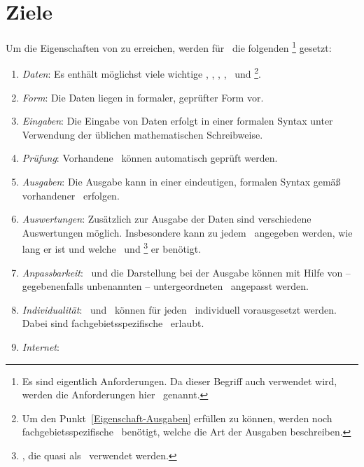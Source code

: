 \section{Ziele}%
\label{sec-Ziele}

Um die Eigenschaften von  zu erreichen, werden für \ASBA\ die folgenden \Ziele%
\footnote{%
	Es sind eigentlich Anforderungen.
	Da dieser Begriff auch  verwendet wird, werden die Anforderungen hier \Ziele\ genannt.
}
gesetzt:
\begin{enumerate}
	\item \label{Ziel-Daten} \emph{Daten}:
	Es enthält möglichst viele wichtige \Axiome, \Saetze, \Beweise, \Fachbegriffe, \Fachgebiete\ und \Ausgabeschemata%
	\footnote{%
		Um den Punkt~\ref{Eigenschaft-Ausgaben}  erfüllen zu können, werden noch fachgebietsspezifische \Ausgabeschemata\ benötigt, welche die Art der Ausgaben beschreiben.
	}.
	\item \label{Ziel-Form} \emph{Form}:
	Die Daten liegen in formaler, geprüfter Form vor.
	\item \label{Ziel-Eingaben} \emph{Eingaben}:
	Die Eingabe von Daten erfolgt in einer formalen Syntax unter Verwendung der üblichen mathematischen Schreibweise.
	\item \label{Ziel-Pruefung} \emph{Prüfung}:
	Vorhandene \Beweise\ können automatisch geprüft werden.
	\item \label{Ziel-Ausgaben} \emph{Ausgaben}:
	Die Ausgabe kann in einer eindeutigen, formalen Syntax gemäß vorhandener \Ausgabeschemata\ erfolgen.
	\item \label{Ziel-Auswertungen} \emph{Auswertungen}:
	Zusätzlich zur Ausgabe der Daten sind verschiedene Auswertungen möglich.
	Insbesondere kann zu jedem \Beweis\ angegeben werden, wie lang er ist und welche \Axiome\ und \Saetze%
	\footnote{
		\Saetze, die quasi als \Axiome\ verwendet werden.
	}
	er benötigt.
	\item \label{Ziel-Anpassbarkeit} \emph{Anpassbarkeit}:
	\Fachbegriffe\ und die Darstellung bei der Ausgabe können mit Hilfe von -- gegebenenfalls unbenannten -- untergeordneten \Fachgebieten\ angepasst werden.
	\item \label{Ziel-Individualitaet} \emph{Individualität}:
	\Axiome\ und \Saetze\ können für jeden \Beweis\ individuell vorausgesetzt werden.
	Dabei sind fachgebietsspezifische \Fachbegriffe\ erlaubt.
	\item \label{Ziel-Internet} \emph{Internet}:

\end{enumerate}
